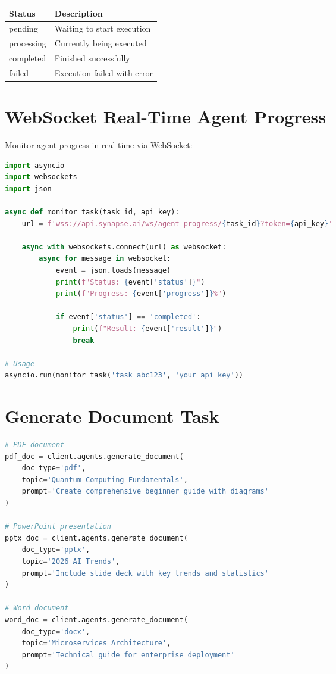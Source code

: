 \documentclass{report}
\begin{document}
\begin{center}
\begin{tabular}{ll}
\toprule
\textbf{Status} & \textbf{Description} \\
\midrule
pending & Waiting to start execution \\
processing & Currently being executed \\
completed & Finished successfully \\
failed & Execution failed with error \\
\bottomrule
\end{tabular}
\end{center}

\section{WebSocket Real-Time Agent Progress}

Monitor agent progress in real-time via WebSocket:

\begin{lstlisting}[language=Python]
import asyncio
import websockets
import json

async def monitor_task(task_id, api_key):
    url = f'wss://api.synapse.ai/ws/agent-progress/{task_id}?token={api_key}'
    
    async with websockets.connect(url) as websocket:
        async for message in websocket:
            event = json.loads(message)
            print(f"Status: {event['status']}")
            print(f"Progress: {event['progress']}%")
            
            if event['status'] == 'completed':
                print(f"Result: {event['result']}")
                break

# Usage
asyncio.run(monitor_task('task_abc123', 'your_api_key'))
\end{lstlisting}

\section{Generate Document Task}

\begin{lstlisting}[language=Python]
# PDF document
pdf_doc = client.agents.generate_document(
    doc_type='pdf',
    topic='Quantum Computing Fundamentals',
    prompt='Create comprehensive beginner guide with diagrams'
)

# PowerPoint presentation
pptx_doc = client.agents.generate_document(
    doc_type='pptx',
    topic='2026 AI Trends',
    prompt='Include slide deck with key trends and statistics'
)

# Word document
word_doc = client.agents.generate_document(
    doc_type='docx',
    topic='Microservices Architecture',
    prompt='Technical guide for enterprise deployment'
)
\end{lstlisting}
\end{document}
